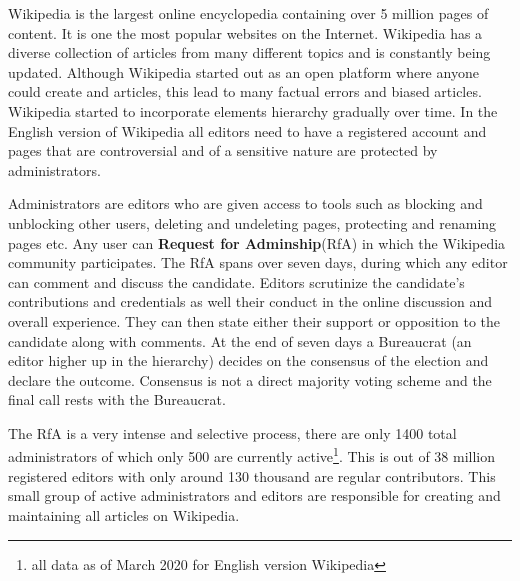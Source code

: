 
Wikipedia is the largest online encyclopedia containing over 5 million pages of content. It is one the most popular websites on the Internet. Wikipedia has a diverse collection of articles from many different topics and is constantly being updated. Although Wikipedia started out as an open platform where anyone could create and articles, this lead to many factual errors and biased articles. Wikipedia started to incorporate elements hierarchy gradually over time. In the English version of Wikipedia all editors need to have a registered account and pages that are controversial and of a sensitive nature are protected by administrators.
\smallskip

Administrators are editors who are given access to tools such as blocking and unblocking other users, deleting and undeleting pages, protecting and renaming pages etc. Any user can \textbf{Request for Adminship}(RfA) in which the Wikipedia community participates. The RfA spans over seven days, during which any editor can comment and discuss the candidate. Editors scrutinize the candidate's contributions and credentials as well their conduct in the online discussion and overall experience. They can then state either their support or opposition to the candidate along with comments. At the end of seven days a Bureaucrat (an editor higher up in the hierarchy) decides on the consensus of the election and declare the outcome. Consensus is not a direct majority voting scheme and the final call rests with the Bureaucrat.
\smallskip

The RfA is a very intense and selective process, there are only 1400 total administrators of which only 500 are currently active\footnote{all data as of March 2020 for English version Wikipedia}. This is out of 38 million registered editors with only around 130 thousand are regular contributors. This small group of active administrators and editors are responsible for creating and maintaining all articles on Wikipedia.
\smallskip


